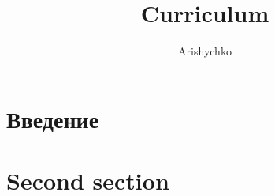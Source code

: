 \documentclass[fleqn, a4paper, 14pt]{extarticle}
\title{Curriculum}
\author{Arishychko}
\begin{document}
\maketitle

\section{Введение}


\section{Second section}

\end{document}
